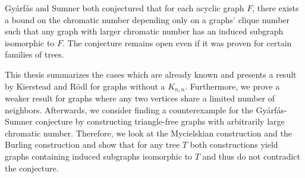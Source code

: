 Gyárfás and Sumner both conjectured that for each acyclic graph $F$, there exists a bound on the chromatic number depending only on a graphs' clique number such that any graph with larger chromatic number has an induced subgraph isomorphic to $F$. The conjecture remains open even if it was proven for certain families of trees.

This thesis summarizes the cases which are already known and presents a result by Kierstead and Rödl for graphs without a $K_{n,n}$. Furthermore, we prove a weaker result for graphs where any two vertices share a limited number of neighbors. Afterwards, we consider finding a counterexample for the Gyárfás-Sumner conjecture by constructing triangle-free graphs with arbitrarily large chromatic number. Therefore, we look at the Mycielskian construction and the Burling construction and show that for any tree $T$ both constructions yield graphs containing induced subgraphs isomorphic to $T$ and thus do not contradict the conjecture.